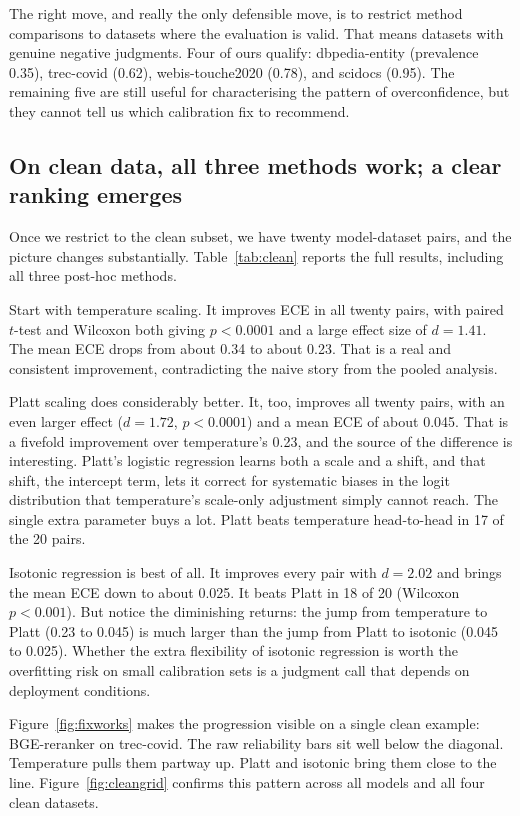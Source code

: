 The right move, and really the only defensible move, is to restrict method
comparisons to datasets where the evaluation is valid. That means datasets with
genuine negative judgments. Four of ours qualify: dbpedia-entity (prevalence 0.35),
trec-covid (0.62), webis-touche2020 (0.78), and scidocs (0.95). The remaining five
are still useful for characterising the pattern of overconfidence, but they cannot
tell us which calibration fix to recommend.

\subsection{On clean data, all three methods work; a clear ranking emerges}
\label{sec:clean}

Once we restrict to the clean subset, we have twenty model-dataset pairs, and the
picture changes substantially. Table~\ref{tab:clean} reports the full results,
including all three post-hoc methods.

Start with temperature scaling. It improves ECE in all twenty pairs, with paired
$t$-test and Wilcoxon both giving $p < 0.0001$ and a large effect size of $d = 1.41$.
The mean ECE drops from about 0.34 to about 0.23. That is a real and consistent
improvement, contradicting the naive story from the pooled analysis.

Platt scaling does considerably better. It, too, improves all twenty pairs, with an
even larger effect ($d = 1.72$, $p < 0.0001$) and a mean ECE of about 0.045. That is
a fivefold improvement over temperature's 0.23, and the source of the difference is
interesting. Platt's logistic regression learns both a scale and a shift, and that
shift, the intercept term, lets it correct for systematic biases in the logit
distribution that temperature's scale-only adjustment simply cannot reach. The single
extra parameter buys a lot. Platt beats temperature head-to-head in 17 of the 20
pairs.

Isotonic regression is best of all. It improves every pair with $d = 2.02$ and brings
the mean ECE down to about 0.025. It beats Platt in 18 of 20 (Wilcoxon
$p < 0.001$). But notice the diminishing returns: the jump from temperature to Platt
(0.23 to 0.045) is much larger than the jump from Platt to isotonic (0.045 to
0.025). Whether the extra flexibility of isotonic regression is worth the overfitting
risk on small calibration sets is a judgment call that depends on deployment
conditions.

Figure~\ref{fig:fixworks} makes the progression visible on a single clean example:
BGE-reranker on trec-covid. The raw reliability bars sit well below the diagonal.
Temperature pulls them partway up. Platt and isotonic bring them close to the line.
Figure~\ref{fig:cleangrid} confirms this pattern across all models and all four clean
datasets.

